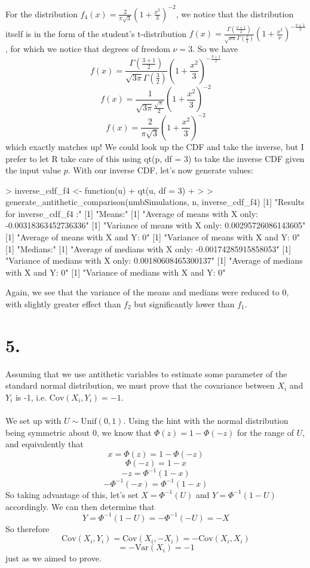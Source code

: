 \documentclass{article}
\begin{document}
{For the distribution \(f_4(x) = \frac{2}{\pi\sqrt{3}}(1 + \frac{x^2}{3})^{-2}\), we notice that the distribution itself is in the form of the student's t-distribution \(f(x) = \frac{\Gamma (\frac{\nu + 1}{2})}{\sqrt{\nu \pi} \Gamma (\frac{\nu}{2})} (1 + \frac{x^2}{\nu})^{-\frac{\nu + 1}{2}} \), for which we notice that degrees of freedom \(\nu = 3\). So we have
\[
  f(x) = \frac{\Gamma (\frac{3 + 1}{2})}{\sqrt{3 \pi} \Gamma (\frac{3}{2})} (1 + \frac{x^2}{3})^{-\frac{3 + 1}{2}}
\]
\[
  f(x) = \frac{1}{\sqrt{3 \pi} \frac{\sqrt{\pi}}{2}} (1 + \frac{x^2}{3})^{-2}
\]
\[
  f(x) = \frac{2}{\pi\sqrt{3}} (1 + \frac{x^2}{3})^{-2}
\]
which exactly matches up! We could look up the CDF and take the inverse, but I prefer to let R take care of this using qt(p, df = 3) to take the inverse CDF given the input value \(p\). With our inverse CDF, let's now generate values:
\begin{spverbatim}
> inverse_cdf_f4 <- function(u) {
+   qt(u, df = 3)
+ }
> 
> generate_antithetic_comparison(nmbSimulations, n, inverse_cdf_f4)
[1] "Results for inverse_cdf_f4 :"
[1] "Means:"
[1] "Average of means with X only: -0.00318363452736336"
[1] "Variance of means with X only: 0.00295726086143605"
[1] "Average of means with X and Y: 0"
[1] "Variance of means with X and Y: 0"
[1] "Medians:"
[1] "Average of medians with X only: -0.00174285915858053"
[1] "Variance of medians with X only: 0.00180608465300137"
[1] "Average of medians with X and Y: 0"
[1] "Variance of medians with X and Y: 0"
\end{spverbatim}
Again, we see that the variance of the means and medians were reduced to 0, with slightly greater effect than \(f_2\) but significantly lower than \(f_1\).

}
{\Large 

\section*{5.}

Assuming that we use antithetic variables to estimate some parameter of the standard normal distribution, we must prove that the covariance between \(X_i\) and \(Y_i\) is -1, i.e. \(\text{Cov}(X_i, Y_i) = -1\). \\ \\
We set up with \(U \sim \text{Unif}(0, 1)\). Using the hint with the normal distribution being symmetric about 0, we know that \(\Phi(z) = 1 - \Phi(-z)\) for the range of \(U\), and equivalently that 
\[
  x = \Phi(z) = 1 - \Phi(-z) 
\]
\[
  \Phi(-z) = 1 - x
\]
\[
  -z = \Phi^{-1}(1 - x)
\]
\[
  -\Phi^{-1}(-x) = \Phi^{-1}(1 - x)
\]
So taking advantage of this, let's set \(X = \Phi^{-1}(U)\) and \(Y = \Phi^{-1}(1 - U)\) accordingly. We can then determine that 
\[
  Y = \Phi^{-1}(1 - U) = -\Phi^{-1}(-U) = -X
\]
So therefore 
\[
  \text{Cov}(X_i, Y_i) = \text{Cov}(X_i, -X_i) = -\text{Cov}(X_i, X_i) 
\]
\[
  = -\text{Var}(X_i) = \boxed{-1}
\]
just as we aimed to prove.

}
\end{document}
